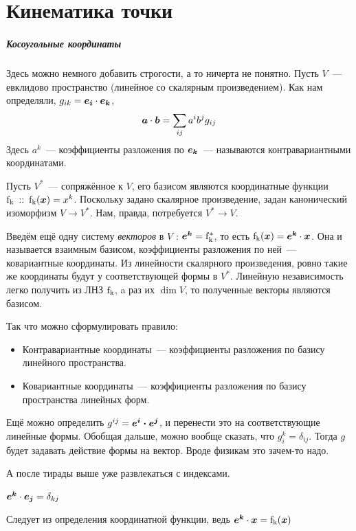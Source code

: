 \documentclass[timbord]{longnotes}
\begin{document}
\chapter{Кинематика точки}

\setcounter{paragraph}{1}
\paragraph{Косоугольные координаты}

Здесь можно немного добавить строгости, а то ничерта не понятно.
Пусть $V$~--- евклидово пространство (линейное со скалярным произведением).
Как нам определяли, $g_{ik} = \v{e_i} \cdot \v{e_k}$,
\[
   \v a \cdot \v b  = \sum_{ij}  a^i b^j g_{ij}
\]
Здесь $a^k$~--- коэффициенты разложения по $\v{e_k}$~--- называются контравариантными координатами.

Пусть $V^*$~--- сопряжённое к $V$, его базисом являются координатные функции
$\v*{f_k} \that \v*{f_k}(\v x) = x^k$. 
Поскольку задано скалярное произведение, задан канонический изоморфизм $V \to V^*$.
Нам, правда, потребуется $V^* \to V$.

Введём ещё одну систему \emph{векторов} в $V$ : $\v{e^k} = \v*{f_k^*}$, то есть 
$\v*{f_k}(\v x) = \v{e^k} \cdot \v x$. 
Она и называется взаимным
базисом, коэффициенты разложения по ней~--- ковариантные координаты.
Из линейности скалярного произведения, ровно такие же координаты будут у соответствующей
формы в $V^*$.
Линейную независимость легко получить из ЛНЗ $\v*{f_k}$, a
раз их $\dim V$, то полученные векторы являются базисом.

Так что можно сформулировать правило:
\begin{itemize}
  \item Контравариантные координаты~--- коэффициенты разложения по базису линейного пространства.
  \item Ковариантные координаты~--- коэффициенты разложения по базису пространства линейных форм.
\end{itemize}
Ещё можно определить $g^{ij} = \v{e^i \cdot e^j}$, и перенести это на 
соответствующие линейные формы. Обобщая дальше, можно вообще сказать, что $g_i^k = \delta_{ij}$.
Тогда $g$ будет задавать действие формы на вектор. Вроде физикам это зачем-то надо.

А после тирады выше уже развлекаться с индексами.

\begin{prop}
  $\v{e^k} \cdot \v{e_j} = \delta_{kj}$
\end{prop}
\begin{lproof}
  Следует из определения координатной функции, ведь $\v{e^k} \cdot \v x = \v*{f_k}(\v x)$
\end{lproof}
\end{document}

